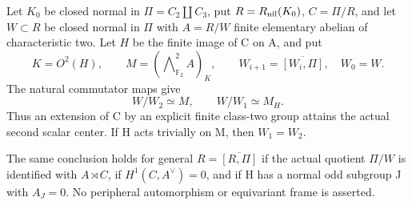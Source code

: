 
Let \(K_0\) be closed normal in \(\Pi=C_2\amalg C_3\), put
\(R=R_{\rm nil}(K_0)\), \(C=\Pi/R\), and let \(W\subset R\)
be closed normal in \(\Pi\) with \(A=R/W\) finite elementary
abelian of characteristic two. Let \(H\) be the finite image of C
on A, and put
\[
 K=O^2(H),\qquad M=(\mathop{\bigwedge}\nolimits^2_{\mathbb F_2}A)_K,
 \qquad W_{i+1}=\overline{[W_i,\Pi]},\quad W_0=W.
 \tag{A.55.1}
\]
The natural commutator maps give
\[
 W/W_2\simeq M,\qquad W/W_1\simeq M_H. \tag{A.55.2}
\]
Thus an extension of C by an explicit finite class-two group attains
the actual second scalar center. If H acts trivially on M, then
\(W_1=W_2\).

The same conclusion holds for general \(R=\overline{[R,\Pi]}\)
if the actual quotient \(\Pi/W\) is identified with \(A\rtimes C\),
if \(H^1(C,A^\vee)=0\), and if H has a normal odd subgroup J with
\(A_J=0\). No peripheral automorphism or equivariant frame is asserted.

